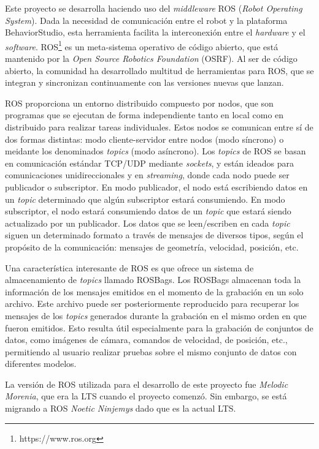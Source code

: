 Este proyecto se desarrolla haciendo uso del \textit{middleware} ROS (\textit{Robot Operating System}). Dada la necesidad de comunicación entre el robot y la plataforma BehaviorStudio, esta herramienta facilita la interconexión entre el \textit{hardware} y el \textit{software}.
ROS\footnote{https://www.ros.org} es un meta-sistema operativo de código abierto, que está mantenido por la \textit{Open Source Robotics Foundation} (OSRF). Al ser de código abierto, la comunidad ha desarrollado multitud de herramientas para ROS, que se integran y sincronizan continuamente con las versiones nuevas que lanzan. 

ROS proporciona un entorno distribuido compuesto por nodos, que son programas que se ejecutan de forma independiente tanto en local como en distribuido para realizar tareas individuales. Estos nodos se comunican entre sí de dos formas distintas: modo cliente-servidor entre nodos (modo síncrono) o meidante los denominados \textit{topics} (modo asíncrono). Los \textit{topics} de ROS se basan en comunicación estándar TCP/UDP mediante \textit{sockets}, y están ideados para comunicaciones unidireccionales y en \textit{streaming}, donde cada nodo puede ser publicador o subscriptor. En modo publicador, el nodo está escribiendo datos en un \textit{topic} determinado que algún subscriptor estará consumiendo. En modo subscriptor, el nodo estará consumiendo datos de un \textit{topic} que estará siendo actualizado por un publicador. Los datos que se leen/escriben en cada \textit{topic} siguen un determinado formato a través de mensajes de diversos tipos, según el propósito de la comunicación: mensajes de geometría, velocidad, posición, etc.

Una característica interesante de ROS es que ofrece un sistema de almacenamiento de \textit{topics} llamado ROSBags. Los ROSBags almacenan toda la información de los mensajes emitidos en el momento de la grabación en un solo archivo. Este archivo puede ser posteriormente reproducido para recuperar los mensajes de los \textit{topics} generados durante la grabación en el mismo orden en que fueron emitidos. Esto resulta útil especialmente para la grabación de conjuntos de datos, como imágenes de cámara, comandos de velocidad, de posición, etc., permitiendo al usuario realizar pruebas sobre el mismo conjunto de datos con diferentes modelos.

La versión de ROS utilizada para el desarrollo de este proyecto fue \textit{Melodic Morenia}, que era la LTS cuando el proyecto comenzó. Sin embargo, se está migrando a ROS \textit{Noetic Ninjemys} dado que es la actual LTS.

